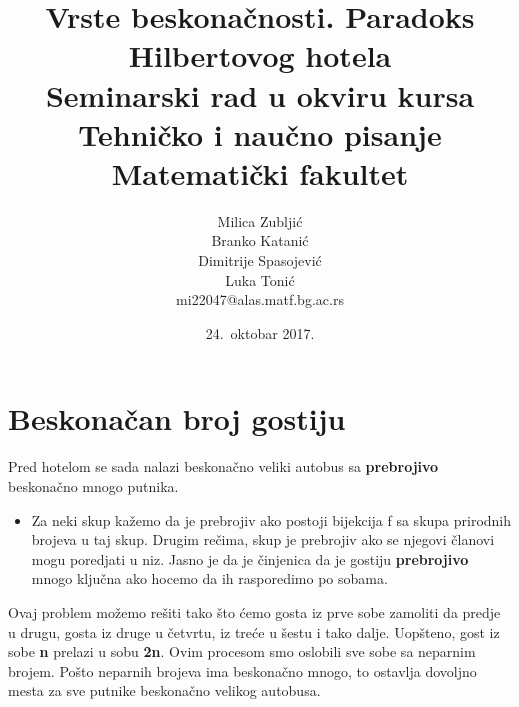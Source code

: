 \documentclass[a4paper]{article}
\begin{document}
\title{Vrste beskonačnosti. Paradoks Hilbertovog hotela\\ \small{Seminarski rad u okviru kursa\\Tehničko i naučno pisanje\\ Matematički fakultet}}

\author{Milica Zubljić\\ Branko Katanić\\ Dimitrije Spasojević\\ Luka Tonić\\ mi22047@alas.matf.bg.ac.rs}
\date{24.~oktobar 2017.} %
\maketitle


\tableofcontents %

\newpage

\section{Beskonačan broj gostiju}
\label{sec:beskonačan broj gostiju}
Pred hotelom se sada nalazi beskonačno veliki autobus sa \textbf {prebrojivo} beskonačno mnogo putnika.
\begin {itemize}
\item Za neki skup kažemo da je prebrojiv ako postoji bijekcija f sa skupa prirodnih brojeva u taj skup.
Drugim rečima, skup je prebrojiv ako se njegovi članovi mogu poredjati u niz.
Jasno je da je činjenica da je gostiju \textbf {prebrojivo} mnogo ključna ako hocemo da ih rasporedimo po sobama. 
\end {itemize}
Ovaj problem možemo rešiti tako što ćemo gosta iz prve sobe zamoliti da predje u drugu, gosta iz druge u četvrtu, iz treće u šestu i tako dalje.
Uopšteno, gost iz sobe \textbf {n} prelazi u sobu \textbf {2n}. Ovim procesom smo oslobili sve sobe sa neparnim brojem.
Pošto neparnih brojeva ima beskonačno mnogo, to ostavlja dovoljno mesta za sve putnike beskonačno velikog autobusa.
\end{document}
